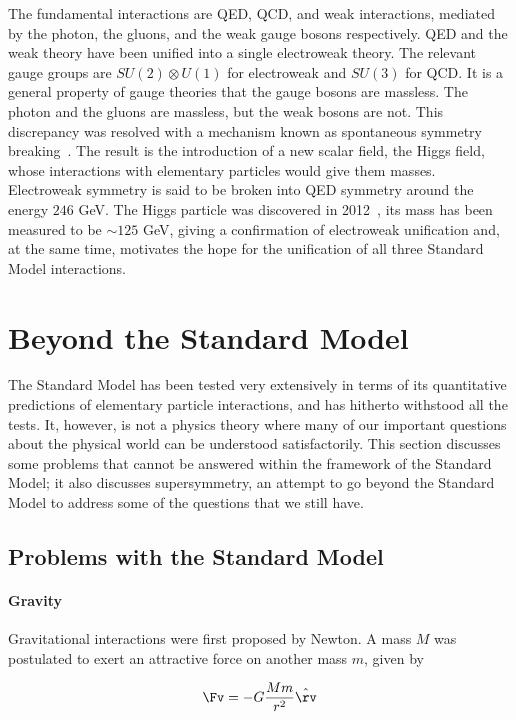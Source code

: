 The fundamental interactions are QED, QCD, and weak interactions, mediated by
the photon, the gluons, and the weak gauge bosons respectively. QED and the
weak theory have been unified into a single electroweak theory. The relevant
gauge groups are $SU(2) \otimes U(1)$ for electroweak and $SU(3)$ for QCD. It
is a general property of gauge theories that the gauge bosons are massless. The
photon and the gluons are massless, but the weak bosons are not. This
discrepancy was resolved with a mechanism known as spontaneous symmetry
breaking~\cite{higgsssb, higgsssb1, higgsssb2}. The result is the introduction
of a new scalar field, the Higgs field, whose interactions with elementary
particles would give them masses. Electroweak symmetry is said to be broken
into QED symmetry around the energy $246$ GeV. The Higgs particle was
discovered in 2012~\cite{higgsdis01, higgsdis02}, its mass has been measured to
be $\sim 125$ GeV, giving a confirmation of electroweak unification and, at the
same time, motivates the hope for the unification of all three Standard Model
interactions.

\section{Beyond the Standard Model}\label{s:smsusy}

The Standard Model has been tested very extensively in terms of its
quantitative predictions of elementary particle interactions, and has hitherto
withstood all the tests. It, however, is not a physics theory where many of our
important questions about the physical world can be understood satisfactorily.
This section discusses some problems that cannot be answered within the
framework of the Standard Model; it also discusses supersymmetry, an attempt to
go beyond the Standard Model to address some of the questions that we still
have.

\subsection{Problems with the Standard Model}

\paragraph{Gravity} Gravitational interactions were first proposed by Newton. A
mass $M$ was postulated to exert an attractive force on another mass $m$, given
by

$$ \Fv = -G \frac{Mm}{r^2}\hat{\rv} $$

